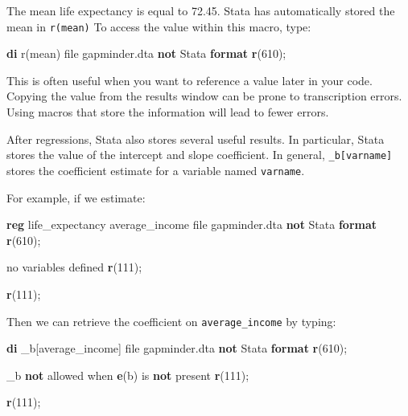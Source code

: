\documentclass[
]{book}
\newenvironment{Shaded}{\begin{snugshade}}{\end{snugshade}}
\newcommand{\FunctionTok}[1]{\textcolor[rgb]{0.13,0.29,0.53}{\textbf{#1}}}
\newcommand{\KeywordTok}[1]{\textcolor[rgb]{0.13,0.29,0.53}{\textbf{#1}}}
\newcommand{\NormalTok}[1]{#1}
\newcommand{\OtherTok}[1]{\textcolor[rgb]{0.56,0.35,0.01}{#1}}
\begin{document}
The mean life expectancy is equal to 72.45. Stata has automatically stored the mean in \texttt{r(mean)}
To access the value within this macro, type:

\begin{Shaded}
\begin{Highlighting}[]
\KeywordTok{di} \OtherTok{\textasciigrave{}r(mean)\textquotesingle{}}
\NormalTok{file gapminder.dta }\KeywordTok{not}\NormalTok{ Stata }\KeywordTok{format}
\FunctionTok{r}\NormalTok{(610);}
\end{Highlighting}
\end{Shaded}

This is often useful when you want to reference a value later in your code. Copying the value from the results window can be prone to transcription errors. Using macros that store the information will lead to fewer errors.

After regressions, Stata also stores several useful results. In particular, Stata stores the value of the intercept and slope coefficient. In general, \texttt{\_b{[}varname{]}} stores the coefficient estimate for a variable named \texttt{varname}.

For example, if we estimate:

\begin{Shaded}
\begin{Highlighting}[]
\KeywordTok{reg}\NormalTok{ life\_expectancy average\_income }
\NormalTok{file gapminder.dta }\KeywordTok{not}\NormalTok{ Stata }\KeywordTok{format}
\FunctionTok{r}\NormalTok{(610);}


\NormalTok{no variables defined}
\FunctionTok{r}\NormalTok{(111);}

\FunctionTok{r}\NormalTok{(111);}
\end{Highlighting}
\end{Shaded}

Then we can retrieve the coefficient on \texttt{average\_income} by typing:

\begin{Shaded}
\begin{Highlighting}[]
\KeywordTok{di}\NormalTok{ \_b[average\_income]}
\NormalTok{file gapminder.dta }\KeywordTok{not}\NormalTok{ Stata }\KeywordTok{format}
\FunctionTok{r}\NormalTok{(610);}


\NormalTok{\_b }\KeywordTok{not}\NormalTok{ allowed when }\FunctionTok{e}\NormalTok{(b) is }\KeywordTok{not}\NormalTok{ present}
\FunctionTok{r}\NormalTok{(111);}

\FunctionTok{r}\NormalTok{(111);}
\end{Highlighting}
\end{Shaded}
\end{document}
